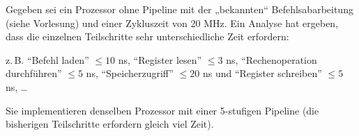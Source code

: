 \question
Gegeben sei ein Prozessor ohne Pipeline mit der „bekannten“ Befehlsabarbeitung (siehe Vorlesung) und einer Zykluszeit von 20 MHz. Ein Analyse hat ergeben, dass die einzelnen Teilschritte sehr unterschiedliche Zeit erfordern:

z.\,B. \enquote{Befehl laden} $\leq 10$ ns, 
\enquote{Register lesen} $\leq 3$ ns, 
\enquote{Rechenoperation durchführen} $\leq 5$ ns, 
\enquote{Speicherzugriff} $\leq 20$ ns und 
\enquote{Register schreiben} $\leq 5$ ns, \dots 

Sie implementieren denselben Prozessor mit einer 5-stufigen Pipeline
(die bisherigen Teilschritte erfordern gleich viel Zeit).

